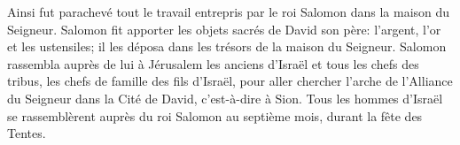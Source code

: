 Ainsi fut parachevé tout le travail entrepris par le roi Salomon
		dans la maison du Seigneur.
Salomon fit apporter les objets sacrés de David son père:
	l’argent, l’or et les ustensiles;
	il les déposa dans les trésors de la maison du Seigneur.
Salomon rassembla auprès de lui à Jérusalem les anciens d’Israël
	et tous les chefs des tribus, les chefs de famille des fils d’Israël,
	pour aller chercher l’arche de l’Alliance du Seigneur dans la Cité de David,
	c’est-à-dire à Sion.
Tous les hommes d’Israël se rassemblèrent auprès du roi Salomon
	au septième mois, durant la fête des Tentes.
